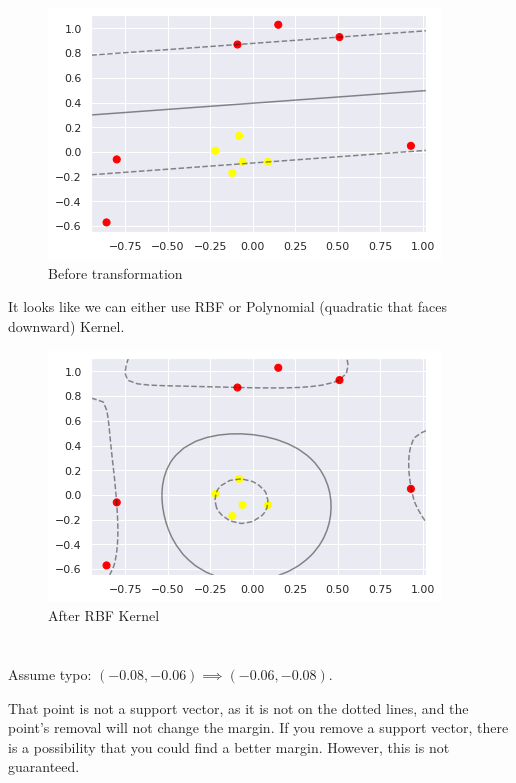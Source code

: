 \documentclass[12pt]{article}
\begin{document}
\section{}
\begin{figure}[H]
	\centering
	\includegraphics{images/5before.png}
	\caption{Before transformation}
	\label{fig:5:before}
\end{figure}
It looks like we can either use RBF or Polynomial (quadratic that faces downward) Kernel.
\begin{figure}[H]
	\centering
	\includegraphics{images/5after.png}
	\caption{After RBF Kernel}
	\label{fig:5:after}
\end{figure}
\newpage

\section{}
Assume typo: $ (-0.08, -0.06) \implies (-0.06, -0.08) $. 
\par That point is not a support vector, as it is not on the dotted lines, and the point's removal will not change the margin. If you remove a support vector, there is a possibility that you could find a better margin. However, this is not guaranteed.
\newpage 
\end{document}
